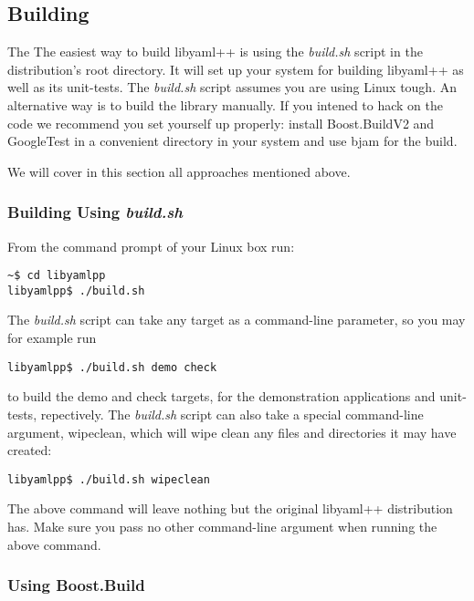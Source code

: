 \documentclass{article}
\begin{document}
\subsection{Building}

The The easiest way to build libyaml++ is using the \textit{build.sh} script in the
distribution's root directory.  It will set up your system for building
libyaml++ as well as its unit-tests.  The \textit{build.sh} script assumes you are using
Linux tough.  An alternative way is to build the library manually.  If you
intened to hack on the code we recommend you set yourself up properly:  install
Boost.BuildV2 and GoogleTest in a convenient directory in your system and use
bjam for the build.

We will cover in this section all approaches mentioned above.

\subsubsection{Building Using \textit{build.sh}}

From the command prompt of your Linux box run:

\begin{verbatim}
~$ cd libyamlpp
libyamlpp$ ./build.sh
\end{verbatim}

The \textit{build.sh} script can take any target as a command-line parameter, so you may
for example run

\begin{verbatim}
libyamlpp$ ./build.sh demo check
\end{verbatim}

to build the demo and check targets, for the demonstration applications and
unit-tests, repectively.  The \textit{build.sh} script can also take a special
command-line argument, wipeclean, which will wipe clean any files and
directories it may have created:

\begin{verbatim}
libyamlpp$ ./build.sh wipeclean
\end{verbatim}

The above command will leave nothing but the original libyaml++ distribution
has.  Make sure you pass no other command-line argument when running the above
command.

\subsubsection{Using Boost.Build}
\end{document}
